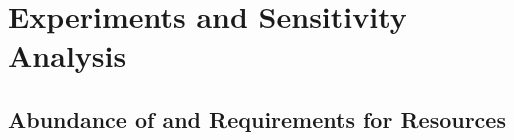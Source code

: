 \FloatBarrier
\section{Experiments and Sensitivity Analysis}

\subsection{Abundance of and Requirements for Resources}


